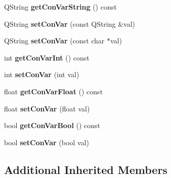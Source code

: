 \begin{DoxyCompactItemize}
\item 
\hypertarget{class_con_var_a25ac4d64950bac9c328e815084a3c089}{Q\-String {\bfseries get\-Con\-Var\-String} () const }\label{class_con_var_a25ac4d64950bac9c328e815084a3c089}

\item 
\hypertarget{class_con_var_ad427b11f271beec5df051fa5c8b2f987}{Q\-String {\bfseries set\-Con\-Var} (const Q\-String \&val)}\label{class_con_var_ad427b11f271beec5df051fa5c8b2f987}

\item 
\hypertarget{class_con_var_a4d7a5a37f5c338b448e0a425d4b30e86}{Q\-String {\bfseries set\-Con\-Var} (const char $\ast$val)}\label{class_con_var_a4d7a5a37f5c338b448e0a425d4b30e86}

\item 
\hypertarget{class_con_var_a2402ef5513453c1de7d302a905e406ed}{int {\bfseries get\-Con\-Var\-Int} () const }\label{class_con_var_a2402ef5513453c1de7d302a905e406ed}

\item 
\hypertarget{class_con_var_ae55d9dc55abf897c61233bf3dd41214c}{int {\bfseries set\-Con\-Var} (int val)}\label{class_con_var_ae55d9dc55abf897c61233bf3dd41214c}

\item 
\hypertarget{class_con_var_ae4c317de396722af0bec990c5d94dfce}{float {\bfseries get\-Con\-Var\-Float} () const }\label{class_con_var_ae4c317de396722af0bec990c5d94dfce}

\item 
\hypertarget{class_con_var_a1cf71ad595ac96881e8fcc84db81b2e7}{float {\bfseries set\-Con\-Var} (float val)}\label{class_con_var_a1cf71ad595ac96881e8fcc84db81b2e7}

\item 
\hypertarget{class_con_var_adae8d7ddfe5266a417f5c09248ad1c88}{bool {\bfseries get\-Con\-Var\-Bool} () const }\label{class_con_var_adae8d7ddfe5266a417f5c09248ad1c88}

\item 
\hypertarget{class_con_var_ad5781a996f6766794542922073d3faff}{bool {\bfseries set\-Con\-Var} (bool val)}\label{class_con_var_ad5781a996f6766794542922073d3faff}

\end{DoxyCompactItemize}
\subsection*{Additional Inherited Members}


